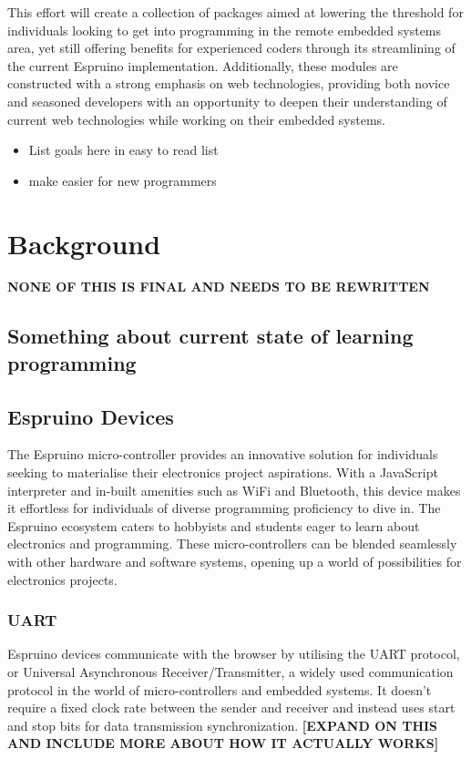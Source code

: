 \documentclass{l4proj}
\begin{document}
\text This effort will create a collection of packages aimed at lowering the threshold for individuals looking to get into programming in the remote embedded systems area, yet still offering benefits for experienced coders through its streamlining of the current Espruino implementation. Additionally, these modules are constructed with a strong emphasis on web technologies, providing both novice and seasoned developers with an opportunity to deepen their understanding of current web technologies while working on their embedded systems.
\begin{itemize}
    \item List goals here in easy to read list
    \item make easier for new programmers
\end{itemize}



\chapter{Background}

\textbf{NONE OF THIS IS FINAL AND NEEDS TO BE REWRITTEN}

\section{Something about current state of learning programming}

\section{Espruino Devices}
\text 
The Espruino micro-controller provides an innovative solution for individuals seeking to materialise their electronics project aspirations. With a JavaScript interpreter and in-built amenities such as WiFi and Bluetooth, this device makes it effortless for individuals of diverse programming proficiency to dive in. The Espruino ecosystem caters to hobbyists and students eager to learn about electronics and programming. These micro-controllers can be blended seamlessly with other hardware and software systems, opening up a world of possibilities for electronics projects.

    
\subsection{UART}
\text Espruino devices communicate with the browser by utilising the UART protocol, or Universal Asynchronous Receiver/Transmitter, a widely used communication protocol in the world of micro-controllers and embedded systems. It doesn't require a fixed clock rate between the sender and receiver and instead uses start and stop bits for data transmission synchronization. \textbf{[EXPAND ON THIS AND INCLUDE MORE ABOUT HOW IT ACTUALLY WORKS]}
\end{document}
